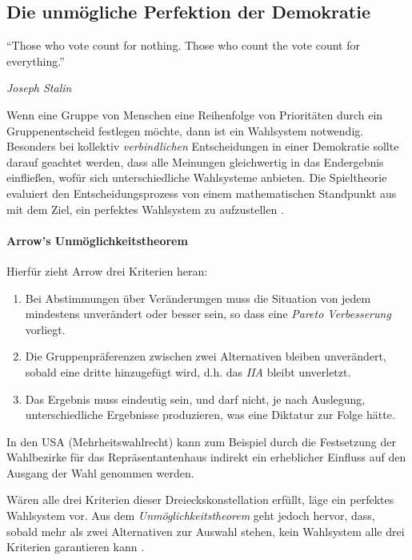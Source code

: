 \subsection{Die unmögliche Perfektion der Demokratie}

\epigraph{
		``Those who vote count for nothing.
		Those who count the vote count for everything.''}
	{
		\emph{Joseph Stalin
	}

Wenn eine Gruppe von Menschen eine Reihenfolge von Prioritäten durch ein Gruppenentscheid festlegen möchte, dann ist ein Wahlsystem notwendig.
Besonders bei kollektiv \emph{verbindlichen} Entscheidungen in einer Demokratie sollte darauf geachtet werden, dass alle Meinungen gleichwertig in das Endergebnis einfließen, wofür sich unterschiedliche Wahlsysteme anbieten.
Die Spieltheorie evaluiert den Entscheidungsprozess von einem mathematischen Standpunkt aus mit dem Ziel, ein perfektes Wahlsystem zu aufzustellen \citep[vgl.]{Kleinberg-2009-oz}.

\paragraph*{Arrow's Unmöglichkeitstheorem}

Hierfür zieht Arrow drei Kriterien heran:

	\begin{enumerate}
		\item Bei Abstimmungen über Veränderungen muss die Situation von jedem mindestens unverändert oder besser sein, so dass eine \emph{Pareto Verbesserung} vorliegt.

		\item Die Gruppenpräferenzen zwischen zwei Alternativen bleiben unverändert, sobald eine dritte hinzugefügt wird, d.h. das \emph{IIA} bleibt unverletzt.

		\item Das Ergebnis muss eindeutig sein, und darf nicht, je nach Auslegung, unterschiedliche Ergebnisse produzieren, was eine Diktatur zur Folge hätte.
	\end{enumerate}

In den USA (Mehrheitswahlrecht) kann zum Beispiel durch die Festsetzung der Wahlbezirke für das Repräsentantenhaus indirekt ein erheblicher Einfluss auf den Ausgang der Wahl genommen werden.

Wären alle drei Kriterien dieser Dreieckskonstellation erfüllt, läge ein perfektes Wahlsystem vor.
Aus dem \emph{Unmöglichkeitstheorem} geht jedoch hervor, dass, sobald mehr als zwei Alternativen zur Auswahl stehen, kein Wahlsystem alle drei Kriterien garantieren kann \citep[vgl.][748]{Kleinberg-2009-oz}.

}
